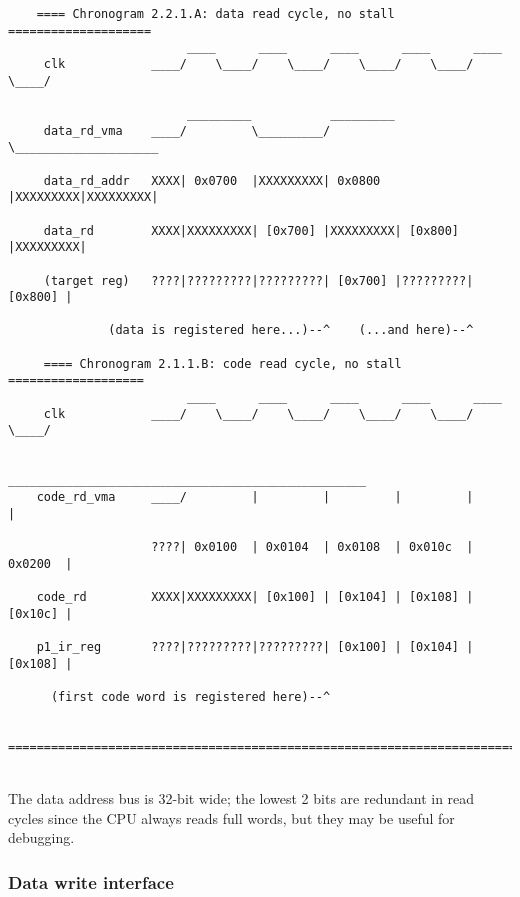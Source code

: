 \documentclass[11pt]{article}
\begin{document}
\begin{verbatim}
    ==== Chronogram 2.2.1.A: data read cycle, no stall ====================
                         ____      ____      ____      ____      ____
     clk            ____/    \____/    \____/    \____/    \____/    \____/

                         _________           _________
     data_rd_vma    ____/         \_________/         \____________________

     data_rd_addr   XXXX| 0x0700  |XXXXXXXXX| 0x0800  |XXXXXXXXX|XXXXXXXXX|

     data_rd        XXXX|XXXXXXXXX| [0x700] |XXXXXXXXX| [0x800] |XXXXXXXXX|

     (target reg)   ????|?????????|?????????| [0x700] |?????????| [0x800] |

              (data is registered here...)--^    (...and here)--^

     ==== Chronogram 2.1.1.B: code read cycle, no stall ===================
                         ____      ____      ____      ____      ____
     clk            ____/    \____/    \____/    \____/    \____/    \____/

                         __________________________________________________
    code_rd_vma     ____/         |         |         |         |         |

                    ????| 0x0100  | 0x0104  | 0x0108  | 0x010c  | 0x0200  |

    code_rd         XXXX|XXXXXXXXX| [0x100] | [0x104] | [0x108] | [0x10c] |

    p1_ir_reg       ????|?????????|?????????| [0x100] | [0x104] | [0x108] |

      (first code word is registered here)--^

    ========================================================================
\end{verbatim}\\

    The data address bus is 32-bit wide; the lowest 2 bits are redundant in 
    read cycles since the CPU always reads full words, but they may be useful 
    for debugging.\\

\subsubsection{Data write interface}
\label{data_write_bus}
\end{document}
